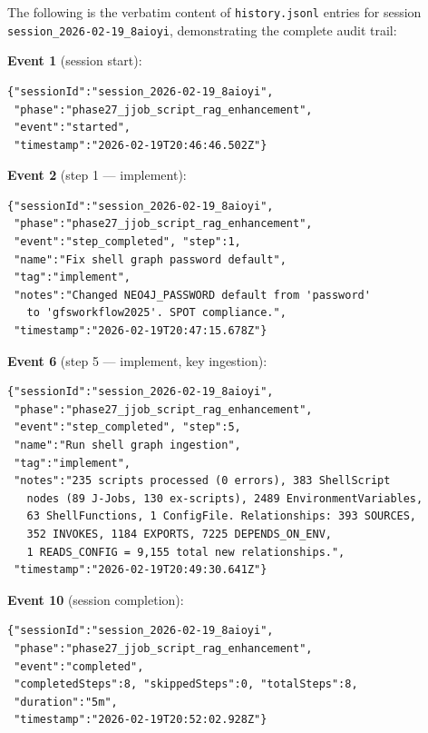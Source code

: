 \documentclass[11pt,letterpaper]{article}
\begin{document}
The following is the verbatim content of \texttt{history.jsonl} entries
for session \texttt{session\_2026-02-19\_8aioyi}, demonstrating the
complete audit trail:

\bigskip
\noindent\textbf{Event 1} (session start):
\begin{lstlisting}[language={}]
{"sessionId":"session_2026-02-19_8aioyi",
 "phase":"phase27_jjob_script_rag_enhancement",
 "event":"started",
 "timestamp":"2026-02-19T20:46:46.502Z"}
\end{lstlisting}

\noindent\textbf{Event 2} (step 1 --- implement):
\begin{lstlisting}[language={}]
{"sessionId":"session_2026-02-19_8aioyi",
 "phase":"phase27_jjob_script_rag_enhancement",
 "event":"step_completed", "step":1,
 "name":"Fix shell graph password default",
 "tag":"implement",
 "notes":"Changed NEO4J_PASSWORD default from 'password'
   to 'gfsworkflow2025'. SPOT compliance.",
 "timestamp":"2026-02-19T20:47:15.678Z"}
\end{lstlisting}

\noindent\textbf{Event 6} (step 5 --- implement, key ingestion):
\begin{lstlisting}[language={}]
{"sessionId":"session_2026-02-19_8aioyi",
 "phase":"phase27_jjob_script_rag_enhancement",
 "event":"step_completed", "step":5,
 "name":"Run shell graph ingestion",
 "tag":"implement",
 "notes":"235 scripts processed (0 errors), 383 ShellScript
   nodes (89 J-Jobs, 130 ex-scripts), 2489 EnvironmentVariables,
   63 ShellFunctions, 1 ConfigFile. Relationships: 393 SOURCES,
   352 INVOKES, 1184 EXPORTS, 7225 DEPENDS_ON_ENV,
   1 READS_CONFIG = 9,155 total new relationships.",
 "timestamp":"2026-02-19T20:49:30.641Z"}
\end{lstlisting}

\noindent\textbf{Event 10} (session completion):
\begin{lstlisting}[language={}]
{"sessionId":"session_2026-02-19_8aioyi",
 "phase":"phase27_jjob_script_rag_enhancement",
 "event":"completed",
 "completedSteps":8, "skippedSteps":0, "totalSteps":8,
 "duration":"5m",
 "timestamp":"2026-02-19T20:52:02.928Z"}
\end{lstlisting}

\end{document}
